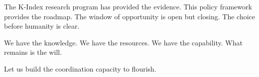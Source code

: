 \documentclass[12pt,letterpaper]{article}
\begin{document}
The K-Index research program has provided the evidence. This policy framework provides the roadmap. The window of opportunity is open but closing. The choice before humanity is clear.

We have the knowledge. We have the resources. We have the capability. What remains is the will.

Let us build the coordination capacity to flourish.




\end{document}
